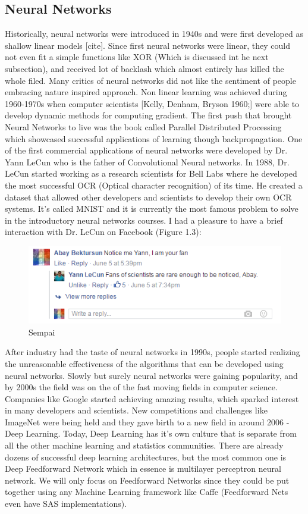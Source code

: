 \documentclass[paper=a4, fontsize=11pt]{scrartcl}
\numberwithin{equation}{section}		%
\numberwithin{figure}{section}			%
\numberwithin{table}{section}			%
\begin{document}
	\subsection{Neural Networks}
	Historically, neural networks were introduced in 1940s and were first developed as shallow linear models [cite]. Since first neural networks were linear, they could not even fit a simple functions like XOR (Which is discussed int he next subsection), and received lot of backlash which almost entirely has killed the whole filed. Many critics of neural networks did not like the sentiment of people embracing nature inspired approach. Non linear learning was achieved during 1960-1970s when computer scientists [Kelly, Denham, Bryson 1960;] were able to develop dynamic methods for computing gradient.
	The first push that brought Neural Networks to live was the book called Parallel Distributed Processing which showcased successful applications of learning though backpropagation.
	One of the first commercial applications of neural networks were developed by Dr. Yann LeCun who is the father of Convolutional Neural networks. In 1988, Dr. LeCun started working as a research scientists for Bell Labs where he developed the most successful OCR (Optical character recognition) of its time. He created a dataset that allowed other developers and scientists to develop their own OCR systems. It's called MNIST and it is currently the most famous problem to solve in the introductory neural networks courses. I had a pleasure to  have a brief interaction with Dr. LeCun on Facebook (Figure 1.3):
	\begin{figure}[!htb]
		\centering
		\includegraphics[scale=0.6]{sempai.PNG}
		\caption{Sempai}
		\label{fig:sempai}
	\end{figure}
	\newline After industry had the taste of neural networks in 1990s, people started realizing the unreasonable effectiveness of the algorithms that can be developed using neural networks. Slowly but surely neural networks were gaining popularity, and by 2000s the field was on the of the fast moving fields in computer science. Companies like Google started achieving amazing results, which sparked interest in many developers and scientists. New competitions and challenges like ImageNet were being held and they gave birth to a new field in around 2006 - Deep Learning. Today, Deep Learning has it's own culture that is separate from all the other machine learning and statistics communities. There are already dozens of successful deep learning architectures, but the most common one is Deep Feedforward Network which in essence is multilayer perceptron neural network. We will only focus on Feedforward Networks since they could be put together using any Machine Learning framework like Caffe (Feedforward Nets even have SAS implementations).
\end{document}
